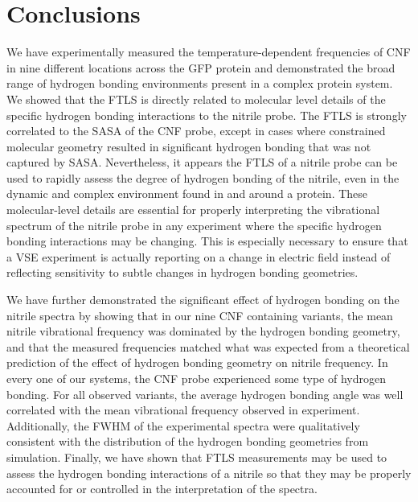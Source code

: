 \section{Conclusions}\label{conclusion}

We have experimentally measured the temperature-dependent frequencies of CNF in nine different locations across the GFP protein and demonstrated the broad range of hydrogen bonding environments present in a complex protein system.
We showed that the FTLS is directly related to molecular level details of the specific hydrogen bonding interactions to the nitrile probe.
The FTLS is strongly correlated to the SASA of the CNF probe, except in cases where constrained molecular geometry resulted in significant hydrogen bonding that was not captured by SASA.
Nevertheless, it appears the FTLS of a nitrile probe can be used to rapidly assess the degree of hydrogen bonding of the nitrile, even in the dynamic and complex environment found in and around a protein.
These molecular-level details are essential for properly interpreting the vibrational spectrum of the nitrile probe in any experiment where the specific hydrogen bonding interactions may be changing.
This is especially necessary to ensure that a VSE experiment is actually reporting on a change in electric field instead of reflecting sensitivity to subtle changes in hydrogen bonding geometries. 

We have further demonstrated the significant effect of hydrogen bonding on the nitrile spectra by showing that in our nine CNF containing variants, the mean nitrile vibrational frequency was dominated by the hydrogen bonding geometry, and that the measured frequencies matched what was expected from a theoretical prediction of the effect of hydrogen bonding geometry on nitrile frequency.
In every one of our systems, the CNF probe experienced some type of hydrogen bonding.
For all observed variants, the average hydrogen bonding angle was well correlated with the mean vibrational frequency observed in experiment.
Additionally, the FWHM of the experimental spectra were qualitatively consistent with the distribution of the hydrogen bonding geometries from simulation.
Finally, we have shown that FTLS measurements may be used to assess the hydrogen bonding interactions of a nitrile so that they may be properly accounted for or controlled in the interpretation of the spectra.





